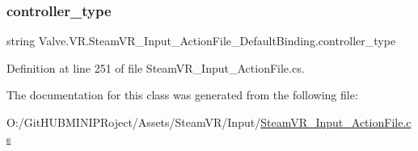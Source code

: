 \subsubsection{\texorpdfstring{controller\_type}{controller\_type}}
{\footnotesize\ttfamily string Valve.\+V\+R.\+Steam\+V\+R\+\_\+\+Input\+\_\+\+Action\+File\+\_\+\+Default\+Binding.\+controller\+\_\+type}



Definition at line 251 of file Steam\+V\+R\+\_\+\+Input\+\_\+\+Action\+File.\+cs.



The documentation for this class was generated from the following file\+:\begin{DoxyCompactItemize}
\item 
O\+:/\+Git\+H\+U\+B\+M\+I\+N\+I\+P\+Roject/\+Assets/\+Steam\+V\+R/\+Input/\mbox{\hyperlink{_steam_v_r___input___action_file_8cs}{Steam\+V\+R\+\_\+\+Input\+\_\+\+Action\+File.\+cs}}\end{DoxyCompactItemize}
